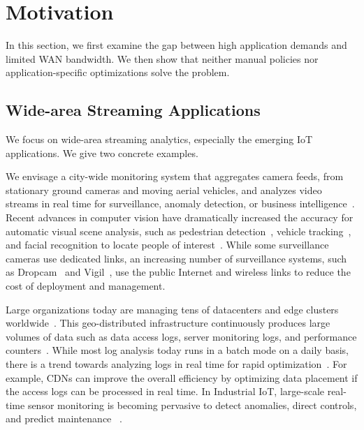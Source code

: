 \section{Motivation}
\label{sec:motivation}

In this section, we first examine the gap between high application demands and
limited WAN bandwidth. We then show that neither manual policies nor
application-specific optimizations solve the problem.

\subsection{Wide-area Streaming Applications}
\label{sec:wide-area-streaming}

We focus on wide-area streaming analytics, especially the emerging IoT
applications. We give two concrete examples.

 We envisage a city-wide monitoring system that
aggregates camera feeds, from stationary ground cameras and moving aerial
vehicles, and analyzes video streams in real time for surveillance, anomaly
detection, or business intelligence~\cite{oh2011large}. Recent advances in
computer vision have dramatically increased the accuracy for automatic visual
scene analysis, such as pedestrian detection~\cite{dollar2012pedestrian},
vehicle tracking~\cite{coifman1998real}, and facial recognition to locate people
of interest~\cite{Lu:2015:SHF:2888116.2888245, parkhi2015deep}. While some
surveillance cameras use dedicated links, an increasing number of surveillance
systems, such as Dropcam~\cite{dropcam} and Vigil~\cite{zhang2015design}, use
the public Internet and wireless links to reduce the cost of deployment and
management.


 Large organizations today are managing tens of
datacenters and edge clusters worldwide~\cite{calder2013mapping}. This
geo-distributed infrastructure continuously produces large volumes of data such
as data access logs, server monitoring logs, and performance
counters~\cite{alspaugh2014analyzing, pu2015low, vulimiri2015global}. While most
log analysis today runs in a batch mode on a daily basis, there is a trend
towards analyzing logs in real time for rapid
optimization~\cite{rabkin2014aggregation}. For example, CDNs can improve the
overall efficiency by optimizing data placement if the access logs can be
processed in real time. In Industrial IoT, large-scale real-time sensor
monitoring is becoming pervasive to detect anomalies, direct controls, and
predict maintenance ~\cite{balani2016enterprise, ge}.

